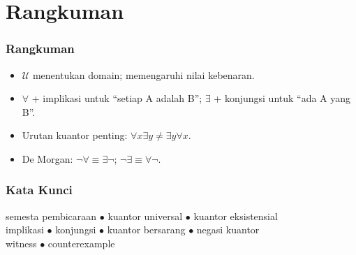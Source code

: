 \documentclass[handout]{beamer}
\theoremstyle{definition}
\theoremstyle{example}
\begin{document}
\section{Rangkuman}

\begin{frame}
\frametitle{Rangkuman}
\begin{itemize}
  \item $\mathcal{U}$ menentukan domain; memengaruhi nilai kebenaran.
  \item $\forall$ + implikasi untuk ``setiap A adalah B''; $\exists$ + konjungsi untuk ``ada A yang B''.
  \item Urutan kuantor penting: $\forall x \exists y \neq \exists y \forall x$.
  \item De Morgan: $\neg\forall \equiv \exists\neg$; $\neg\exists \equiv \forall\neg$.
\end{itemize}
\end{frame}

\begin{frame}
\frametitle{Kata Kunci}
\begin{center}
semesta pembicaraan $\bullet$ kuantor universal $\bullet$ kuantor eksistensial\\
implikasi $\bullet$ konjungsi $\bullet$ kuantor bersarang $\bullet$ negasi kuantor\\
witness $\bullet$ counterexample
\end{center}
\end{frame}
\end{document}
